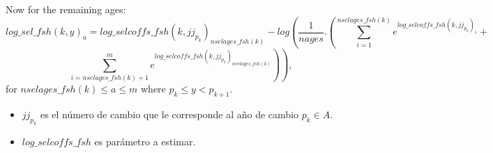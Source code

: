 \documentclass{article}
\begin{document}
\begin{itemize}
  Now for the remaining ages:
    \begin{equation}
         log\_sel\_fsh(k,y)_a=log\_selcoffs\_fsh(k,jj_{p_k})_{nselages\_fsh(k)}-log\left(\dfrac{1}{nages}.\left(\sum_{i=1}^{nselages\_fsh(k)}e^{log\_selcoffs\_fsh(k,jj_{p_k})_i}+\right.\right.
    \end{equation}
 \begin{equation*}
       \left. \left.\sum_{i=nselages\_fsh(k)+1}^{m}e^{log\_selcoffs\_fsh(k,jj_{p_k})_{nselages\_fsh(k)}}\right)\right), 
    \end{equation*}
    for $nselages\_fsh(k)\leq a \leq m$ where $p_k\leq y < p_{k+1}$.
    \begin{itemize}
        \item $jj_{p_k}$ es el número de cambio que le corresponde al año de cambio $p_k\in A$.
        \item $log\_selcoffs\_fsh$ es parámetro a estimar.
    \end{itemize}














    
   
    

\end{itemize}
\end{document}
